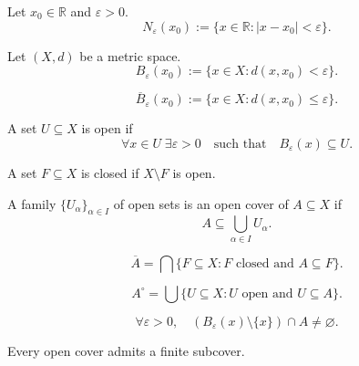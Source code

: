 \begin{definition}
Let $x_0\in\mathbb{R}$ and $\varepsilon>0$.
\[
N_\varepsilon(x_0)
:=
\{x\in\mathbb{R} : |x-x_0|<\varepsilon\}.
\]
\end{definition}

\begin{definition}
Let $(X,d)$ be a metric space.
\[
B_\varepsilon(x_0)
:=
\{x\in X : d(x,x_0)<\varepsilon\}.
\]
\end{definition}

\begin{definition}
\[
\overline{B}_\varepsilon(x_0)
:=
\{x\in X : d(x,x_0)\le\varepsilon\}.
\]
\end{definition}

\begin{definition}
A set $U\subseteq X$ is open if
\[
\forall x\in U\;\exists \varepsilon>0
\quad\text{such that}\quad
B_\varepsilon(x)\subseteq U.
\]
\end{definition}

\begin{definition}
A set $F\subseteq X$ is closed if $X\setminus F$ is open.
\end{definition}

\begin{definition}
A family $\{U_\alpha\}_{\alpha\in I}$ of open sets is an open cover of $A\subseteq X$ if
\[
A \subseteq \bigcup_{\alpha\in I} U_\alpha.
\]
\end{definition}

\begin{definition}[Closure]
\[
\overline{A}
=
\bigcap\{F\subseteq X : F \text{ closed and } A\subseteq F\}.
\]
\end{definition}

\begin{definition}[Interior]
\[
A^\circ
=
\bigcup\{U\subseteq X : U \text{ open and } U\subseteq A\}.
\]
\end{definition}

\begin{definition}
\[
\forall \varepsilon>0,\quad
(B_\varepsilon(x)\setminus\{x\})\cap A \neq \varnothing.
\]
\end{definition}

\begin{definition}
Every open cover admits a finite subcover.
\end{definition}

